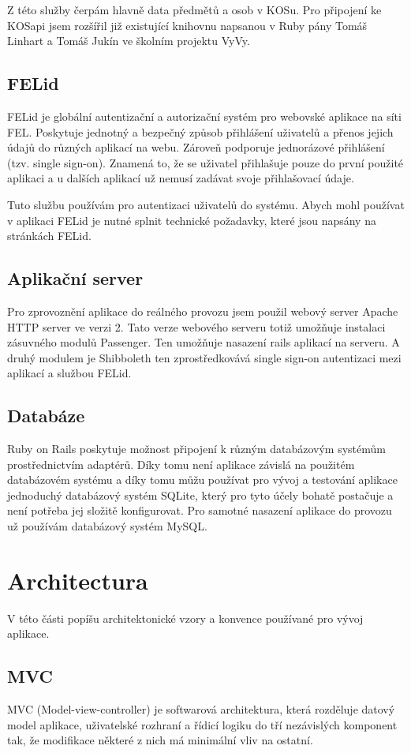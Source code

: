 Z této služby čerpám hlavně data předmětů a osob v KOSu. Pro připojení ke KOSapi jsem rozšířil již existující knihovnu napsanou v Ruby pány Tomáš Linhart a Tomáš Jukín ve školním projektu VyVy. 

\subsection{FELid}
FELid je globální autentizační a autorizační systém pro webovské aplikace na síti FEL. Poskytuje jednotný a bezpečný způsob přihlášení uživatelů a přenos jejich údajů do různých aplikací na webu. Zároveň podporuje jednorázové přihlášení (tzv. single sign-on). Znamená to, že se uživatel přihlašuje pouze do první použité aplikaci a u dalších aplikací už nemusí zadávat svoje přihlašovací údaje.

Tuto službu používám pro autentizaci uživatelů do systému. Abych mohl používat v aplikaci FELid je nutné splnit technické požadavky, které jsou napsány na stránkách FELid.

\subsection{Aplikační server}
Pro zprovoznění aplikace do reálného provozu jsem použil webový server Apache HTTP server ve verzi 2. Tato verze webového serveru totiž umožňuje instalaci zásuvného modulů Passenger. Ten umožňuje nasazení rails aplikací na serveru. A druhý modulem je Shibboleth ten zprostředkovává single sign-on autentizaci mezi aplikací a službou FELid.

\subsection{Databáze}
Ruby on Rails poskytuje možnost připojení k různým databázovým systémům prostřednictvím adaptérů. Díky tomu není aplikace závislá na použitém databázovém systému a díky tomu můžu používat pro vývoj a testování aplikace jednoduchý databázový systém SQLite, který pro tyto účely bohatě postačuje a není potřeba jej složitě konfigurovat. Pro samotné nasazení aplikace do provozu už používám databázový systém MySQL.

\section{Architectura}
V této části popíšu architektonické vzory a konvence používané pro vývoj aplikace. 

\subsection{MVC}
MVC (Model-view-controller) je softwarová architektura, která rozděluje datový model aplikace, uživatelské rozhraní a řídicí logiku do tří nezávislých komponent tak, že modifikace některé z nich má minimální vliv na ostatní. 

